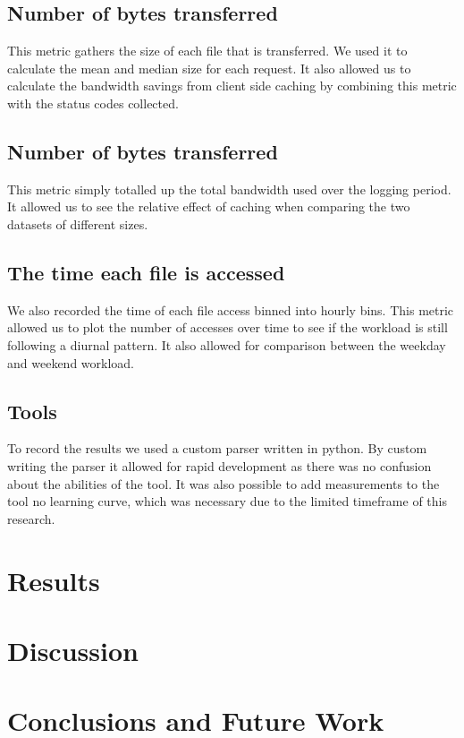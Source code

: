 \documentclass[10pt,conference]{IEEEtran}
\begin{document}
\subsection{Number of bytes transferred}
This metric gathers the size of each file that is transferred. We used it to calculate the mean and median size for each request. 
It also allowed us to calculate the bandwidth savings from client side caching by combining this metric with the status codes collected.

\subsection{Number of bytes transferred}
This metric simply totalled up the total bandwidth used over the logging period. It allowed us to see the relative effect of caching when comparing the two datasets of different sizes.

\subsection{The time each file is accessed}
We also recorded the time of each file access binned into hourly bins. This metric allowed us to plot the number of accesses over time to see if the workload is still following a diurnal pattern. It also allowed for comparison between the weekday and weekend workload.

\subsection{Tools}
To record the results we used a custom parser written in python. By custom writing the parser it allowed for rapid development as there was no confusion about the abilities of the tool. It was also possible to add measurements to the tool no learning curve, which was necessary due to the limited timeframe of this research.

\section{Results}\label{results}

\section{Discussion}\label{discussion}

\section{Conclusions and Future Work}\label{conclusions}



\end{document}
